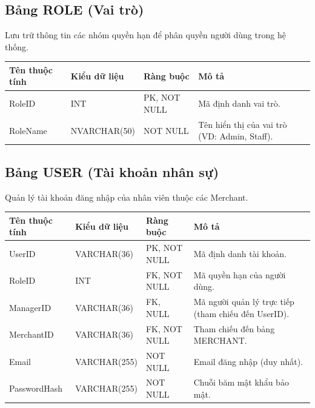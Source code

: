 \subsection{Bảng ROLE (Vai trò)}
Lưu trữ thông tin các nhóm quyền hạn để phân quyền người dùng trong hệ thống.

\begin{table}[htbp]
    \centering
    \renewcommand{\arraystretch}{1.3}
    \begin{tabular}{|p{3cm}|p{3.2cm}|>{\raggedright\arraybackslash}p{3.2cm}|>{\raggedright\arraybackslash}p{4.8cm}|}
        \hline
        \textbf{Tên thuộc tính} & \textbf{Kiểu dữ liệu} & \textbf{Ràng buộc} & \textbf{Mô tả} \\ \hline
        RoleID & INT & PK, NOT NULL & Mã định danh vai trò. \\ \hline
        RoleName & NVARCHAR(50) & NOT NULL & Tên hiển thị của vai trò (VD: Admin, Staff). \\ \hline
    \end{tabular}
\end{table}

\subsection{Bảng USER (Tài khoản nhân sự)}
Quản lý tài khoản đăng nhập của nhân viên thuộc các Merchant.

\begin{table}[htbp]
    \centering
    \renewcommand{\arraystretch}{1.3}
    \begin{tabular}{|p{3cm}|p{3.2cm}|>{\raggedright\arraybackslash}p{3.2cm}|>{\raggedright\arraybackslash}p{4.8cm}|}
        \hline
        \textbf{Tên thuộc tính} & \textbf{Kiểu dữ liệu} & \textbf{Ràng buộc} & \textbf{Mô tả} \\ \hline
        UserID & VARCHAR(36) & PK, NOT NULL & Mã định danh tài khoản. \\ \hline
        RoleID & INT & FK, NOT NULL & Mã quyền hạn của người dùng. \\ \hline
        ManagerID & VARCHAR(36) & FK, NULL & Mã người quản lý trực tiếp (tham chiếu đến UserID). \\ \hline
        MerchantID & VARCHAR(36) & FK, NOT NULL & Tham chiếu đến bảng MERCHANT. \\ \hline
        Email & VARCHAR(255) & NOT NULL & Email đăng nhập (duy nhất). \\ \hline
        PasswordHash & VARCHAR(255) & NOT NULL & Chuỗi băm mật khẩu bảo mật. \\ \hline
    \end{tabular}
\end{table}

